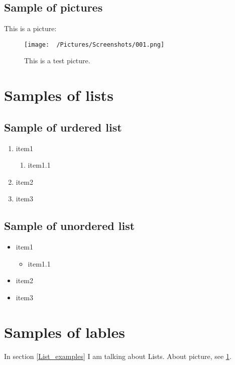 
\subsection{Sample of pictures}
This is a picture:
\begin{figure}[!hbtp]
    \begin{center}
    \texttt{[image: ~/Pictures/Screenshots/001.png]}
    \end{center}
    \caption{This is a test picture.\label{Picture_example}}
\end{figure}


\section{Samples of lists\label{List_examples}}

\subsection{Sample of urdered list}
\begin{enumerate}
    \item item1
        \begin{enumerate}
            \item item1.1
        \end{enumerate}
    \item item2
    \item item3
\end{enumerate}

\subsection{Sample of unordered list}
\begin{itemize}
    \item item1
        \begin{itemize}
            \item item1.1
        \end{itemize}
    \item item2
    \item item3
\end{itemize}

\section{Samples of lables}
In section \ref{List_examples} I am talking about Lists. About picture, see \ref{Picture_example}.

